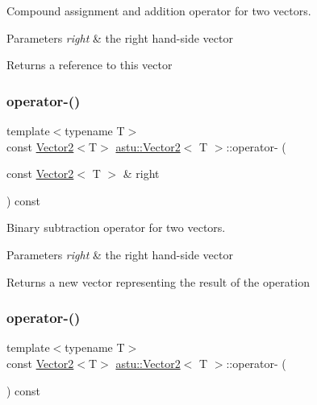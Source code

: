 Compound assignment and addition operator for two vectors.


\begin{DoxyParams}{Parameters}
{\em right} & the right hand-\/side vector \\
\hline
\end{DoxyParams}
\begin{DoxyReturn}{Returns}
a reference to this vector 
\end{DoxyReturn}
\mbox{\label{classastu_1_1Vector2_a694ff874fcdb2118ed665a7cb28978e9}} 
\subsubsection{\texorpdfstring{operator-\/()}{operator-()}\hspace{0.1cm}{\footnotesize\ttfamily [1/2]}}
{\footnotesize\ttfamily template$<$typename T$>$ \\
const \hyperlink{classastu_1_1Vector2}{Vector2}$<$T$>$ \hyperlink{classastu_1_1Vector2}{astu\+::\+Vector2}$<$ T $>$\+::operator-\/ (\begin{DoxyParamCaption}\item[{const \hyperlink{classastu_1_1Vector2}{Vector2}$<$ T $>$ \&}]{right }\end{DoxyParamCaption}) const\hspace{0.3cm}{\ttfamily [inline]}}

Binary subtraction operator for two vectors.


\begin{DoxyParams}{Parameters}
{\em right} & the right hand-\/side vector \\
\hline
\end{DoxyParams}
\begin{DoxyReturn}{Returns}
a new vector representing the result of the operation 
\end{DoxyReturn}
\mbox{\label{classastu_1_1Vector2_aaa65baf8ffd013a0401c4875d91337a4}} 
\subsubsection{\texorpdfstring{operator-\/()}{operator-()}\hspace{0.1cm}{\footnotesize\ttfamily [2/2]}}
{\footnotesize\ttfamily template$<$typename T$>$ \\
const \hyperlink{classastu_1_1Vector2}{Vector2}$<$T$>$ \hyperlink{classastu_1_1Vector2}{astu\+::\+Vector2}$<$ T $>$\+::operator-\/ (\begin{DoxyParamCaption}{ }\end{DoxyParamCaption}) const\hspace{0.3cm}{\ttfamily [inline]}}

